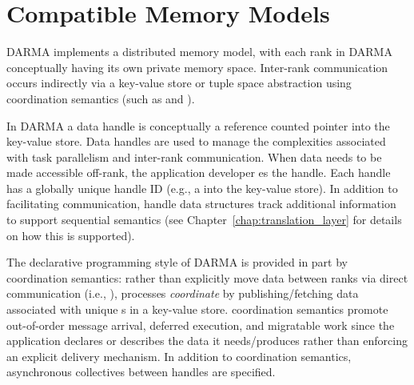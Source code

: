 
\section{Compatible Memory Models}
\label{sec:memmodel}

\gls{DARMA} implements a \gls{distributed memory model}, with each \gls{rank}
in \gls{DARMA} conceptually having its own private memory space. 
Inter-\gls{rank} communication occurs indirectly via a 
\gls{key-value store} or \gls{tuple space} abstraction using
\gls{coordination semantics} (such as  and
). 

In \gls{DARMA} a data \gls{handle} is conceptually a \gls{reference counted pointer} into the
\gls{key-value store}.  Data \glspl{handle} are used to manage the
complexities associated with \gls{task parallelism} and inter-\gls{rank} communication.  
When data needs to be made accessible off-\gls{rank}, the application developer 
es the \gls{handle}.  Each \gls{handle} has a globally unique handle ID
(e.g., a  into the \gls{key-value store}).  
In addition to facilitating communication, \gls{handle} data structures track
additional information to support \gls{sequential semantics} (see Chapter~\ref{chap:translation_layer} for details on how this is supported).

The \gls{declarative} programming style of \gls{DARMA} is provided in part by \gls{coordination
semantics}:  rather than explicitly move data between \glspl{rank} via direct communication
(i.e.,  ), processes \emph{coordinate} by
publishing/fetching data associated with unique s in a
\gls{key-value store}.
\Gls{coordination semantics} promote out-of-order message arrival,
\gls{deferred execution}, and \gls{migratable} work 
since the application declares or describes the data it needs/produces rather than enforcing an explicit delivery mechanism.
In addition to \gls{coordination semantics}, \gls{asynchronous} collectives
between \glspl{handle} are specified. 






